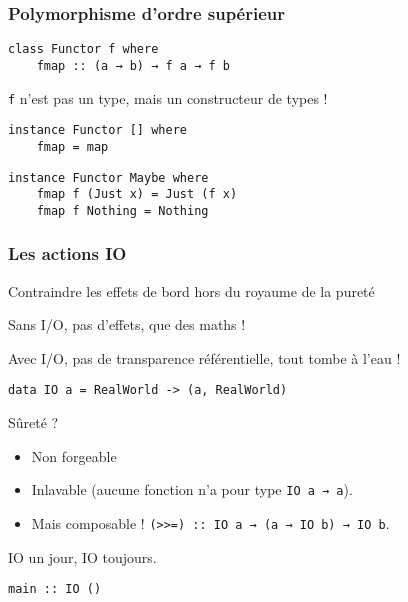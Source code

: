 \documentclass[10pt]{beamer}
\begin{document}
\begin{frame}[fragile]
\frametitle{Polymorphisme d'ordre supérieur}
\begin{verbatim}
class Functor f where
    fmap :: (a → b) → f a → f b
\end{verbatim}
\pause
\verb|f| n'est pas un type, mais un constructeur de types !
\pause
\begin{verbatim}
instance Functor [] where
    fmap = map
\end{verbatim}
\pause
\begin{verbatim}
instance Functor Maybe where
    fmap f (Just x) = Just (f x)
    fmap f Nothing = Nothing
\end{verbatim}
\end{frame}



\begin{frame}[fragile]
\frametitle{Les actions IO}
\begin{block}
{Contraindre les effets de bord hors du royaume de la pureté}

Sans I/O, pas d'effets, que des maths !

\pause

Avec I/O, pas de transparence référentielle, tout tombe à l'eau !

\pause

\verb|data IO a = RealWorld -> (a, RealWorld)|

\end{block}

\pause

\begin{block}
{Sûreté ?}

\begin{itemize}

\item Non forgeable

\pause

\item Inlavable (aucune fonction n'a pour type \verb|IO a → a|).

\pause

\item Mais composable ! \verb|(>>=) :: IO a → (a → IO b) → IO b|.

\end{itemize}

IO un jour, IO toujours.

\end{block}

\verb|main :: IO ()|

\end{frame}
\end{document}

